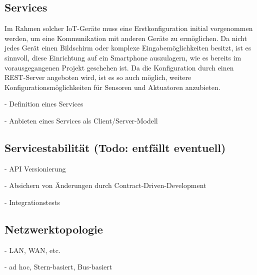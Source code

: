     \subsection{Services}
    
    Im Rahmen solcher IoT-Geräte muss eine Erstkonfiguration initial vorgenommen werden, um eine Kommunikation mit anderen Geräte zu ermöglichen. Da nicht jedes Gerät einen Bildschirm oder komplexe Eingabemöglichkeiten besitzt, ist es sinnvoll, diese Einrichtung auf ein Smartphone auszulagern, wie es bereits im vorausgegangenen Projekt geschehen ist. Da die Konfiguration durch einen REST-Server angeboten wird, ist es so auch möglich, weitere Konfigurationsmöglichkeiten für Sensoren und Aktuatoren anzubieten.    
    
    - Definition eines Services
    
    - Anbieten eines Services als Client/Server-Modell
    
    \subsection{Servicestabilität (Todo: entfällt eventuell)}
    - API Versionierung
    
    - Absichern von Änderungen durch Contract-Driven-Development
    
    - Integrationstests
    \subsection{Netzwerktopologie}
		- LAN, WAN, etc.
		
		- ad hoc, Stern-basiert, Bus-basiert
